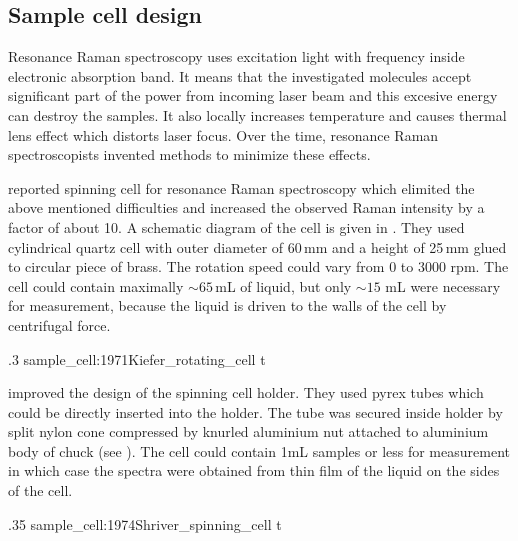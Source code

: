 \subsection{Sample cell design}
\label{sample_cell}

Resonance Raman spectroscopy uses excitation light
with frequency inside electronic absorption band. It means that the
investigated molecules accept significant part of the power from incoming
laser beam and this excesive energy can destroy the samples. It also locally
increases temperature and causes thermal lens effect which distorts laser
focus. Over the time, resonance Raman spectroscopists invented methods to
minimize these effects.

\textcite{Kiefer1971} reported spinning cell for resonance Raman spectroscopy
which elimited the above mentioned difficulties and increased the observed
Raman intensity by a factor of about 10. A schematic diagram of the cell is
given in
.
They used cylindrical quartz cell with outer diameter of 60\,mm and a height
of 25\,mm glued to circular piece of brass. The rotation speed could vary from
0 to 3000 rpm. The cell could contain maximally $\sim 65$\,mL of liquid, but
only $\sim 15$ mL were necessary for measurement, because the liquid is driven
to the walls of the cell by centrifugal force.

%
{.3}%
{sample_cell:1971Kiefer_rotating_cell}%
{t}

\textcite{Shriver1974} improved the design of the spinning cell holder. They
used pyrex tubes which could be directly inserted into the holder. The tube
was secured inside holder by split nylon cone compressed by knurled aluminium
nut attached to aluminium body of chuck (see
).
The cell could contain 1mL samples or less for measurement in which case the
spectra were obtained from thin film of the liquid on the sides of the cell.

%
{.35}%
{sample_cell:1974Shriver_spinning_cell}
{t}

